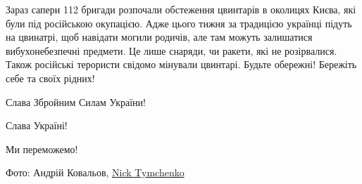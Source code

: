 Зараз сапери 112 бригади розпочали обстеження цвинтарів в околицях Києва, які
були під російською окупацією. Адже цього тижня за традицією українці підуть на
цвинатрі, щоб навідати могили родичів, але там можуть залишатися
вибухонебезпечні предмети. Це лише снаряди, чи ракети, які не розірвалися.
Також російські терористи свідомо мінували цвинтарі. Будьте обережні! Бережіть
себе та своїх рідних!


Слава Збройним Силам України! 

Слава Україні! 

Ми переможемо! 

Фото: Андрій Ковальов, \href{https://www.facebook.com/nick.tymchenko1}{Nick Tymchenko}


